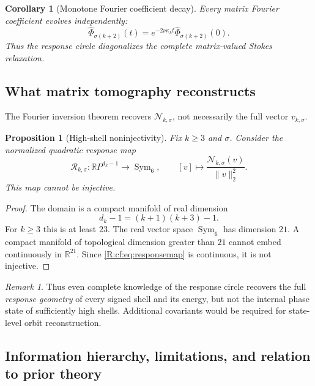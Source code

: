 \documentclass[
 aps,
 prd,
 reprint,
 amsmath,
 amssymb,
 nofootinbib,
 superscriptaddress
]{revtex4-2}
\newtheorem{proposition}[theorem]{Proposition}
\newtheorem{corollary}[theorem]{Corollary}
\theoremstyle{definition}
\theoremstyle{remark}
\newtheorem{remark}[theorem]{Remark}
\newcommand{\cN}{\mathscr N}
\begin{document}
\begin{corollary}[Monotone Fourier coefficient decay]
Every matrix Fourier coefficient evolves independently:
\[
 \widehat\Phi_{\sigma(k+2)}(t)
 =
 e^{-2\nu\kappa_kt}
 \widehat\Phi_{\sigma(k+2)}(0).
\]
Thus the response circle diagonalizes the complete matrix-valued Stokes
relaxation.
\end{corollary}

\subsection{What matrix tomography reconstructs}

The Fourier inversion theorem recovers
$\cN_{k,\sigma}$, not necessarily the full vector
$v_{k,\sigma}$.

\begin{proposition}[High-shell noninjectivity]
\label{R:cf:prop:noninjective}
Fix $k\ge3$ and $\sigma$.  Consider the normalized quadratic response map
\begin{equation}
 \mathcal R_{k,\sigma}:
 \mathbb RP^{d_k-1}
 \longrightarrow
 \operatorname{Sym}_6,
 \qquad
 [v]
 \longmapsto
 \frac{\cN_{k,\sigma}(v)}{\|v\|_2^2}.
 \label{R:cf:eq:responsemap}
\end{equation}
This map cannot be injective.
\end{proposition}

\begin{proof}
The domain is a compact manifold of real dimension
\[
       d_k-1=(k+1)(k+3)-1.
\]
For $k\ge3$ this is at least $23$.  The real vector space
$\operatorname{Sym}_6$ has dimension $21$.  A compact manifold of topological
dimension greater than $21$ cannot embed continuously in $\mathbb R^{21}$.
Since \eqref{R:cf:eq:responsemap} is continuous, it is not injective.
\end{proof}

\begin{remark}
Thus even complete knowledge of the response circle recovers the full
\emph{response geometry} of every signed shell and its energy, but not the
internal phase state of sufficiently high shells.  Additional covariants
would be required for state-level orbit reconstruction.
\end{remark}

\subsection{Information hierarchy, limitations, and relation to prior theory}
\end{document}
